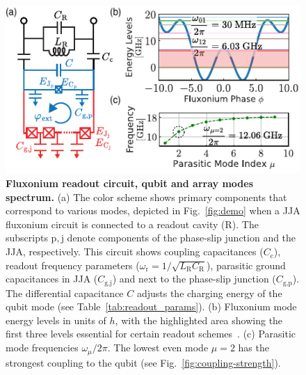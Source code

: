\documentclass[%
reprint,
superscriptaddress,
 amsmath,amssymb,
 aps,
 prx,
longbibliography,
floatfix,
]{revtex4-2}
\begin{document}
\begin{figure}[t]
\centering    
\includegraphics[width=\linewidth]{Figures/Meas_Circuit.pdf}
\caption{{\bf Fluxonium readout circuit, qubit and array modes spectrum.} (a) The color scheme shows primary components that correspond to various modes, depicted in Fig.~\ref{fig:demo} when a JJA fluxonium circuit is connected to a readout cavity (R). The subscripts $\mathrm{p,j}$ denote components of the phase-slip junction and the JJA, respectively. This circuit shows coupling capacitances ($C_\textrm{c}$), readout frequency parameters ($\omega_\textrm{r}=1/\sqrt{L_\textrm{R}C_\textrm{R}}$), parasitic ground capacitances in JJA ($C_\textrm{g,j}$) and next to the phase-slip junction ($C_\textrm{g,p}$). The differential capacitance $C$ adjusts the charging energy of the qubit mode (see Table~\ref{tab:readout_params}). (b) Fluxonium mode energy levels in units of $h$, with the highlighted area showing the first three levels essential for certain readout schemes~\cite{zhang_universal_2021}. (c) Parasitic mode frequencies $\omega_\mu/2\pi$. The lowest even mode $\mu = 2$ has the strongest coupling to the qubit (see Fig.~\ref{fig:coupling-strength}).
}
\label{fig:meas_circuit}
\end{figure}
\end{document}

